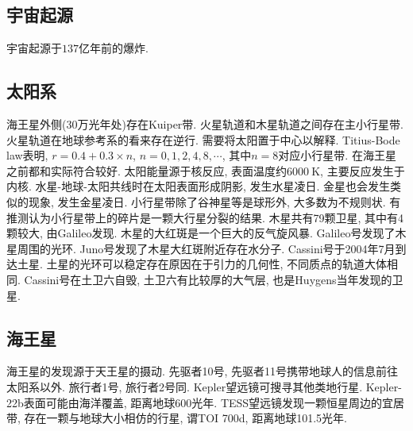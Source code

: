 \documentclass[hidelinks]{ctexart}
\begin{document}

\subsection{宇宙起源} %
\label{sub:宇宙起源}

\newpoint{}宇宙起源于$137$亿年前的爆炸.


\subsection{太阳系} %
\label{sub:太阳系}

\newpoint{}海王星外侧($30$万光年处)存在Kuiper带.
\newpoint{}火星轨道和木星轨道之间存在主小行星带.
\newpoint{}火星轨道在地球参考系的看来存在逆行. 需要将太阳置于中心以解释.
\newpoint{}Titius-Bode law表明, $r = 0.4 + 0.3\times n$, $n = 0,1,2,4,8,\cdots$, 其中$n=8$对应小行星带. 在海王星之前都和实际符合较好.
\newpoint{}太阳能量源于核反应, 表面温度约$\SI{6000}{\kelvin}$, 主要反应发生于内核.
\newpoint{}水星-地球-太阳共线时在太阳表面形成阴影, 发生水星凌日.
\newpoint{}金星也会发生类似的现象, 发生金星凌日.
\newpoint{}小行星带除了谷神星等是球形外, 大多数为不规则状. 有推测认为小行星带上的碎片是一颗大行星分裂的结果.
\newpoint{}木星共有79颗卫星, 其中有4颗较大, 由Galileo发现.
\newpoint{}木星的大红斑是一个巨大的反气旋风暴.
\newpoint{}Galileo号发现了木星周围的光环.
\newpoint{}Juno号发现了木星大红斑附近存在水分子.
\newpoint{}Cassini号于2004年7月到达土星.
\newpoint{}土星的光环可以稳定存在原因在于引力的几何性, 不同质点的轨道大体相同.
\newpoint{}Cassini号在土卫六自毁, 土卫六有比较厚的大气层, 也是Huygens当年发现的卫星.


\subsection{海王星} %
\label{sub:海王星}

\newpoint{}海王星的发现源于天王星的摄动.
\newpoint{}先驱者10号, 先驱者11号携带地球人的信息前往太阳系以外. 旅行者1号, 旅行者2号同.
\newpoint{}Kepler望远镜可搜寻其他类地行星.
\newpoint{}Kepler-22b表面可能由海洋覆盖, 距离地球600光年.
\newpoint{}TESS望远镜发现一颗恒星周边的宜居带, 存在一颗与地球大小相仿的行星, 谓TOI 700d, 距离地球101.5光年.


\end{document}
